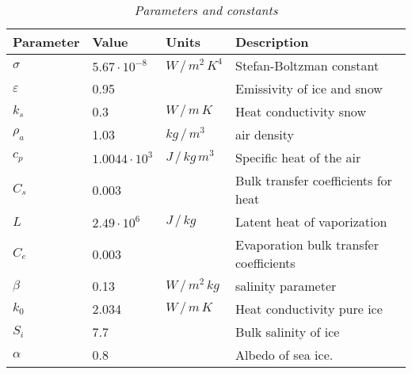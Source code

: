 \documentclass[a4paper,12pt]{article}
\begin{document}
\begin{table}[h]
    \caption{\em Parameters and constants}\vspace{5pt}
    \label{tab:param_const}
    \centering
    \begin{tabular}{llll}
        Parameter     & Value                 & Units            & Description                             \\
        \hline                                                                                               
        $\sigma$      &  $5.67\cdot 10^{-8}$  & $W\,/\,m^2\,K^4$ & Stefan-Boltzman constant                \\
        $\varepsilon$ &  0.95                 &                  & Emissivity of ice and snow              \\
        $k_s$         &  0.3                  & $W\,/\,m\,K$     & Heat conductivity snow                  \\
        $\rho_a$      &  1.03                 & $kg\,/\,m^3$     & air density                             \\
        $c_p$         &  $1.0044\cdot 10^{3}$ & $J\,/\,kg\,m^3$  & Specific heat of the air                \\
        $C_s$         &  0.003                &                  & Bulk transfer coefficients for heat     \\
        $L$           &  $2.49\cdot 10^{6}$   & $J\,/\,kg$       & Latent heat of vaporization             \\
        $C_e$         &  0.003                &                  & Evaporation bulk transfer coefficients  \\
        $\beta$       &  0.13                 & $W\,/\,m^2\,kg$  & salinity parameter                      \\
        $k_0$         &  2.034                & $W\,/\,m\,K$     & Heat conductivity pure ice              \\
        $S_i$         &  7.7                  &                  & Bulk salinity of ice                    \\ 
        $\alpha$      &  0.8                  &                  & Albedo of sea ice.                      \\
        \hline
    \end{tabular}
\end{table}
\end{document}
